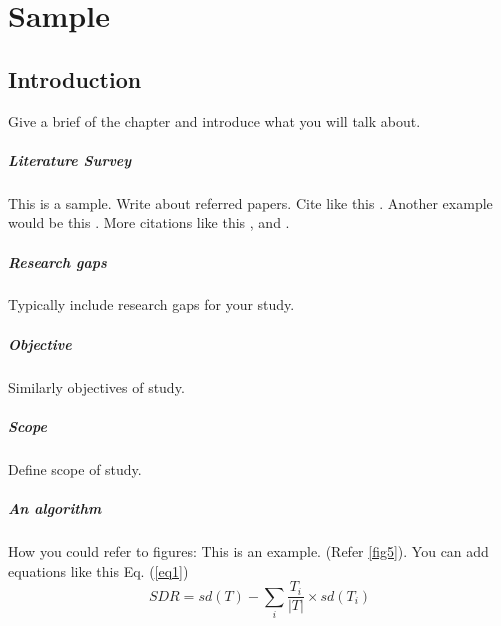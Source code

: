 
\chapter{Sample} %
\graphicspath{{Pictures/Chapter2}}
\label{Chapter 2} %


\section{Introduction}



Give a brief of the chapter and introduce what you will talk about. 


\paragraph{Literature Survey}

This is a sample. Write about referred papers. Cite like this \citep{nip2010cyclic}. Another example would be this \citep{nip2010extremely}. More citations like this \citep{bird2004evaluating}, \citep {tremblay2003seismic} and \citep {alhamaydeh2016key}.

\paragraph{Research gaps}
Typically include research gaps for your study. 
\paragraph{Objective}
Similarly objectives of study. 
\paragraph{Scope}
Define scope of study. 
\paragraph{An algorithm}
How you could refer to figures: This is an example. (Refer \ref{fig5}). You can add equations like this Eq. (\ref{eq1})
\begin{equation}
\label{eq1}
  SDR = sd(T) - \sum_{i}\frac{{T}_{i}}{|T|}\times sd({T}_{i})
\end{equation}

